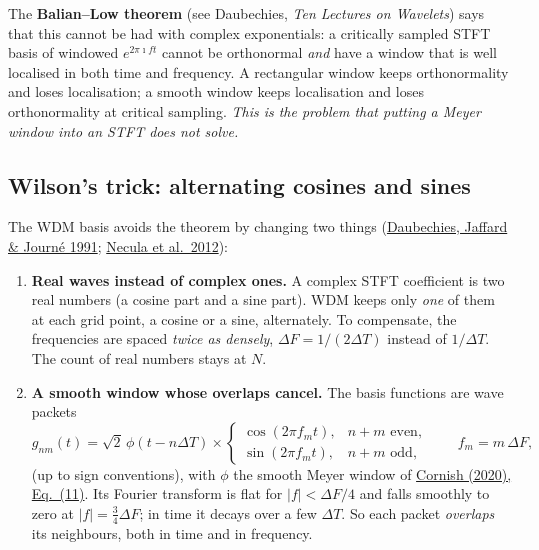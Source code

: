 \documentclass[11pt,a4paper]{article}
\newcommand{\urlCornish}{https://arxiv.org/abs/2009.00043}
\newcommand{\CornishEq}[1]{\href{\urlCornish}{Cornish (2020), Eq.~(#1)}}
\begin{document}
The \textbf{Balian--Low theorem} (see Daubechies, \emph{Ten Lectures on Wavelets})
says that this cannot be had with complex exponentials: a critically sampled
STFT basis of windowed $e^{2\pi\imath ft}$ cannot be orthonormal \emph{and} have a
window that is well localised in both time and frequency. A rectangular window keeps
orthonormality and loses localisation; a smooth window keeps localisation and loses
orthonormality at critical sampling. \emph{This is the problem that putting a Meyer
window into an STFT does not solve.}

\subsection{Wilson's trick: alternating cosines and sines}

The WDM basis avoids the theorem by changing two things
(\href{https://doi.org/10.1137/0522035}{Daubechies, Jaffard \& Journ\'e 1991};
\href{https://doi.org/10.1088/1742-6596/363/1/012032}{Necula et al.\ 2012}):
\begin{enumerate}
  \item \textbf{Real waves instead of complex ones.} A complex STFT coefficient is two
        real numbers (a cosine part and a sine part). WDM keeps only \emph{one} of
        them at each grid point, a cosine or a sine, alternately. To compensate, the
        frequencies are spaced \emph{twice as densely}, $\Delta F = 1/(2\Delta T)$
        instead of $1/\Delta T$. The count of real numbers stays at $N$.
  \item \textbf{A smooth window whose overlaps cancel.} The basis functions are wave
        packets
        \begin{equation}
          g_{nm}(t) = \sqrt2\,\phi(t-n\Delta T)\times
          \begin{cases}
            \cos(2\pi f_m t), & n+m \text{ even},\\
            \sin(2\pi f_m t), & n+m \text{ odd},
          \end{cases}
          \qquad f_m = m\,\Delta F,
          \label{eq:gnm}
        \end{equation}
        (up to sign conventions), with $\phi$ the smooth Meyer window of
        \CornishEq{11}. Its Fourier transform is flat for $|f|<\Delta F/4$ and falls
        smoothly to zero at $|f|=\tfrac34\Delta F$; in time it decays over a few
        $\Delta T$. So each packet \emph{overlaps} its neighbours, both in time and in
        frequency.
\end{enumerate}
\end{document}
